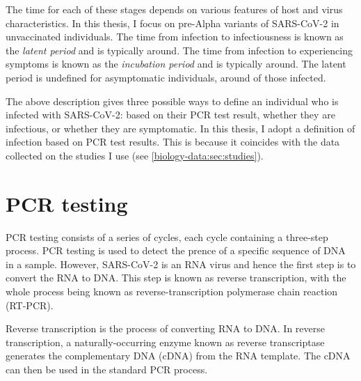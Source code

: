 \documentclass[thesis.tex]{subfiles}
\begin{document}
The time for each of these stages depends on various features of host and virus characteristics.
In this thesis, I focus on pre-Alpha variants of SARS-CoV-2 in unvaccinated individuals.
The time from infection to infectiousness is known as the \emph{latent period} and is typically around.
The time from infection to experiencing symptoms is known as the \emph{incubation period} and is typically around.
The latent period is undefined for asymptomatic individuals, around of those infected.

The above description gives three possible ways to define an individual who is infected with SARS-CoV-2: based on their PCR test result, whether they are infectious, or whether they are symptomatic.
In this thesis, I adopt a definition of infection based on PCR test results.
This is because it coincides with the data collected on the studies I use (see \cref{biology-data:sec:studies}).



\section{PCR testing} \label{biology-data:sec:PCR}


PCR testing consists of a series of cycles, each cycle containing a three-step process.
PCR testing is used to detect the prence of a specific sequence of DNA in a sample.
However, SARS-CoV-2 is an RNA virus and hence the first step is to convert the RNA to DNA.
This step is known as reverse transcription, with the whole process being known as reverse-transcription polymerase chain reaction (RT-PCR).

Reverse transcription is the process of converting RNA to DNA.
In reverse transcription, a naturally-occurring enzyme known as reverse transcriptase generates the complementary DNA (cDNA) from the RNA template.
The cDNA can then be used in the standard PCR process.
\end{document}
